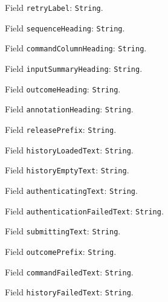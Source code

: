\documentclass[11pt]{article}
\begin{document}
\noindent Field \texttt{retryLabel}: \texttt{String}.\par
\noindent Field \texttt{sequenceHeading}: \texttt{String}.\par
\noindent Field \texttt{commandColumnHeading}: \texttt{String}.\par
\noindent Field \texttt{inputSummaryHeading}: \texttt{String}.\par
\noindent Field \texttt{outcomeHeading}: \texttt{String}.\par
\noindent Field \texttt{annotationHeading}: \texttt{String}.\par
\noindent Field \texttt{releasePrefix}: \texttt{String}.\par
\noindent Field \texttt{historyLoadedText}: \texttt{String}.\par
\noindent Field \texttt{historyEmptyText}: \texttt{String}.\par
\noindent Field \texttt{authenticatingText}: \texttt{String}.\par
\noindent Field \texttt{authenticationFailedText}: \texttt{String}.\par
\noindent Field \texttt{submittingText}: \texttt{String}.\par
\noindent Field \texttt{outcomePrefix}: \texttt{String}.\par
\noindent Field \texttt{commandFailedText}: \texttt{String}.\par
\noindent Field \texttt{historyFailedText}: \texttt{String}.\par
\end{document}
